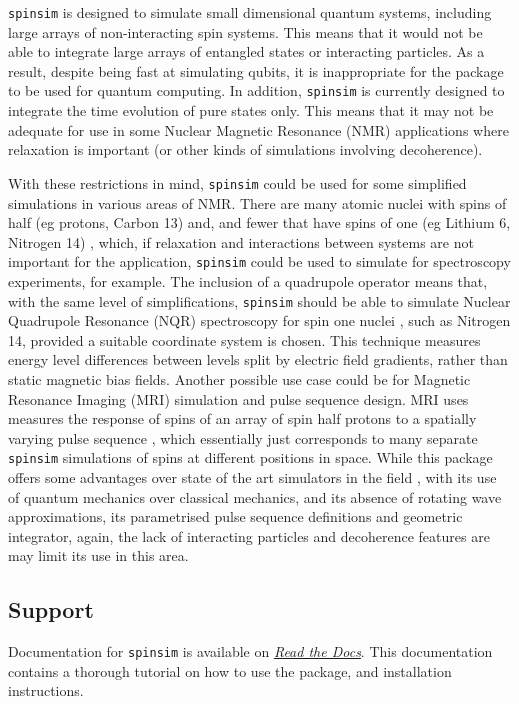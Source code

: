 \documentclass{jors}
\begin{document}
		\texttt{spinsim} is designed to simulate small dimensional quantum systems, including large arrays of non-interacting spin systems. This means that it would not be able to integrate large arrays of entangled states or interacting particles. As a result, despite being fast at simulating qubits, it is inappropriate for the package to be used for quantum computing. In addition, \texttt{spinsim} is currently designed to integrate the time evolution of pure states only. This means that it may not be adequate for use in some Nuclear Magnetic Resonance (NMR) applications where relaxation \cite{veshtort_spinevolution_2006} is important (or other kinds of simulations involving decoherence).

		With these restrictions in mind, \texttt{spinsim} could be used for some simplified simulations in various areas of NMR. There are many atomic nuclei with spins of half (eg protons, Carbon 13) and, and fewer that have spins of one (eg Lithium 6, Nitrogen 14) \cite{fuller_nuclear_1976}, which, if relaxation and interactions between systems are not important for the application, \texttt{spinsim} could be used to simulate for spectroscopy experiments, for example. The inclusion of a quadrupole operator means that, with the same level of simplifications, \texttt{spinsim} should be able to simulate Nuclear Quadrupole Resonance (NQR) spectroscopy for spin one nuclei \cite{bain_nqr_2004}, such as Nitrogen 14, provided a suitable coordinate system is chosen. This technique measures energy level differences between levels split by electric field gradients, rather than static magnetic bias fields. Another possible use case could be for Magnetic Resonance Imaging (MRI) simulation and pulse sequence design. MRI uses measures the response of spins of an array of spin half protons to a spatially varying pulse sequence \cite{mckinnon_physics_1998}, which essentially just corresponds to many separate \texttt{spinsim} simulations of spins at different positions in space. While this package offers some advantages over state of the art simulators in the field \cite{kose_fast_2019}, with its use of quantum mechanics over classical mechanics, and its absence of rotating wave approximations, its parametrised pulse sequence definitions and geometric integrator, again, the lack of interacting particles and decoherence features are may limit its use in this area.

	\subsection*{Support}
		Documentation for \texttt{spinsim} is available on \href{https://spinsim.readthedocs.io/en/latest/}{\emph{Read the Docs}}. This documentation contains a thorough tutorial on how to use the package, and installation instructions.
		
\end{document}
